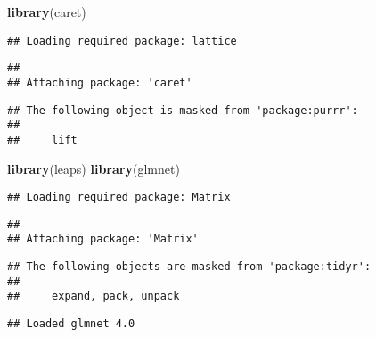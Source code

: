 \documentclass[
]{article}
\newenvironment{Shaded}{\begin{snugshade}}{\end{snugshade}}
\newcommand{\KeywordTok}[1]{\textcolor[rgb]{0.13,0.29,0.53}{\textbf{#1}}}
\newcommand{\NormalTok}[1]{#1}
\begin{document}
\begin{Shaded}
\begin{Highlighting}[]
\KeywordTok{library}\NormalTok{(caret)}
\end{Highlighting}
\end{Shaded}

\begin{verbatim}
## Loading required package: lattice
\end{verbatim}

\begin{verbatim}
## 
## Attaching package: 'caret'
\end{verbatim}

\begin{verbatim}
## The following object is masked from 'package:purrr':
## 
##     lift
\end{verbatim}

\begin{Shaded}
\begin{Highlighting}[]
\KeywordTok{library}\NormalTok{(leaps)}
\KeywordTok{library}\NormalTok{(glmnet)}
\end{Highlighting}
\end{Shaded}

\begin{verbatim}
## Loading required package: Matrix
\end{verbatim}

\begin{verbatim}
## 
## Attaching package: 'Matrix'
\end{verbatim}

\begin{verbatim}
## The following objects are masked from 'package:tidyr':
## 
##     expand, pack, unpack
\end{verbatim}

\begin{verbatim}
## Loaded glmnet 4.0
\end{verbatim}
\end{document}
